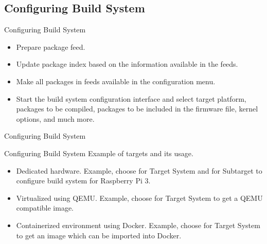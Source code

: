 \subsection{Configuring Build System}
\begin{frame}{Configuring Build System}
    \pause
    \begin{itemize}[<+-|alert@+>]
        \item Prepare package feed. \\
        \item Update package index based on the information available in the feeds. \\
        \item Make all packages in feeds available in the configuration menu. \\
        \item Start the build system configuration interface and select target platform, packages to be compiled, packages to be included in the firmware file, kernel options, and much more. \\
    \end{itemize}
\end{frame}

\begin{frame}{Configuring Build System}
\end{frame}

\begin{frame}{Configuring Build System}
    Example of targets and its usage.
    \pause
    \begin{itemize}[<+-|alert@+>]
        \item Dedicated hardware. Example, choose  for Target System and  for Subtarget to configure build system for Raspberry Pi 3.
        \item Virtualized using QEMU. Example, choose  for Target System to get a QEMU compatible image.
        \item Containerized environment using Docker. Example, choose  for Target System to get an image which can be imported into Docker.
    \end{itemize}
\end{frame}

